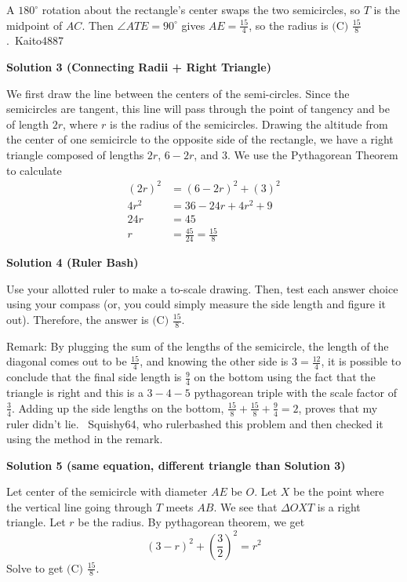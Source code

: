 \begin{enumerate}
A $180^\circ$ rotation about the rectangle’s center swaps the two semicircles, so $T$ is the midpoint of $AC$. Then $\angle ATE = 90^\circ$ gives $AE = \frac{15}{4}$, so the radius is $\boxed{\text{(C) } \frac{15}{8}}$.~Kaito4887

 



\textbf{Solution 3 (Connecting Radii + Right Triangle)}

We first draw the line between the centers of the semi-circles.  Since the semicircles are tangent, this line will pass through the point of tangency and be of length $2r$, where $r$ is the radius of the semicircles.  Drawing the altitude from the center of one semicircle to the opposite side of the rectangle, we have a right triangle composed of lengths $2r$, $6-2r$, and $3$.  We use the Pythagorean Theorem to calculate 
 \begin{align*}(2r)^2&=(6-2r)^2+(3)^2\\ 4r^{2}&=36-24r+4r^{2}+9\\24r&=45\\r&=\frac{45}{24}=\boxed{\frac{15}{8}}\end{align*}





\textbf{Solution 4 (Ruler Bash)}

Use your allotted ruler to make a to-scale drawing. Then, test each answer choice using your compass (or, you could simply measure the side length and figure it out). Therefore, the answer is $\boxed{\text{(C) } \frac{15}{8}}.$

 Remark: By plugging the sum of the lengths of the semicircle, the length of the diagonal comes out to be $\frac{15}{4}$, and knowing the other side is $3=\frac{12}{4}$, it is possible to conclude that the final side length is $\frac{9}{4}$ on the bottom using the fact that the triangle is right and this is a $3-4-5$ pythagorean triple with the scale factor of $\frac{3}{4}$. Adding up the side lengths on the bottom, $\frac{15}{8}+\frac{15}{8}+\frac{9}{4}=2$, proves that my ruler didn't lie. ~Squishy64, who rulerbashed this problem and then checked it using the method in the remark.

 



\textbf{Solution 5 (same equation, different triangle than Solution 3)}

Let center of the semicircle with diameter $AE$ be $O$. Let $X$ be the point where the vertical line going through $T$ meets $AB$. We see that $\Delta OXT$ is a right triangle. Let $r$ be the radius. By pythagorean theorem, we get 
 \[(3-r)^2 + \left(\frac{3}{2}\right)^2 = r^2\] Solve to get $\boxed{\text{(C) } \frac{15}{8}}$.


\end{enumerate}
